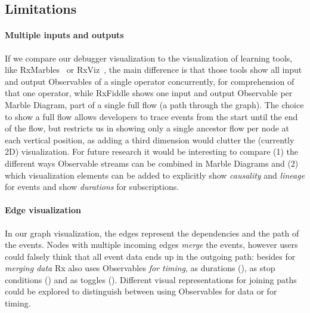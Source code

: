 \subsection{Limitations}

\paragraph{Multiple inputs and outputs} If we compare our debugger
visualization to the visualization of learning tools, like RxMarbles~\cite
{rxmarbles} or RxViz~\cite{rxviz},
the main difference is that those tools show all input and output Observables 
of a single operator concurrently, for comprehension of that one operator,
while RxFiddle shows one input and output Observable per Marble Diagram, part of a
single full flow (a path through the graph).  The choice to show a full
flow allows developers to trace events from the start until the end of the
flow, but restricts us in showing only a single ancestor flow per node
at each vertical position, as adding a third dimension would clutter the
(currently 2D) visualization.  For future research it would be
interesting to compare (1) the different ways Observable streams can be
combined in Marble Diagrams and (2) which visualization elements can be
added to explicitly show \emph{causality} and \emph{lineage} for events
and show \emph{durations} for subscriptions.

\paragraph{Edge visualization} In our graph visualization, the edges
represent the dependencies and the path of the events.  Nodes with
multiple incoming edges \emph{merge} the events, however users could
falsely think that all event data ends up in the outgoing path:  besides
for \textit{merging data} Rx also uses Observables \textit{for timing},
as durations (), as stop conditions () and
as toggles ().  Different visual representations for
joining paths could be explored to distinguish between using
Observables for data or for timing.


